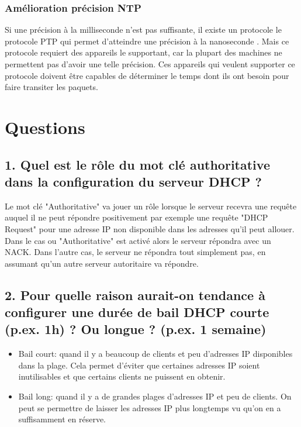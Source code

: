 \documentclass{article}
\begin{document}
\subsubsection{Amélioration précision NTP} 
Si une précision à la milliseconde n'est pas suffisante, il existe un protocole le protocole PTP qui permet d'atteindre une précision à la nanoseconde \cite{PTP}. Mais ce protocole requiert des appareils le supportant, car la plupart des machines ne permettent pas d'avoir une telle précision. Ces appareils qui veulent supporter ce protocole doivent être capables de déterminer le temps dont ils ont besoin pour faire transiter les paquets.

\clearpage

\section{Questions}

\subsection*{1. Quel est le rôle du mot clé authoritative dans la configuration du serveur DHCP ?}
Le mot clé "Authoritative" va jouer un rôle lorsque le serveur recevra une requête auquel il ne peut répondre positivement par exemple une requête "DHCP Request" pour une adresse IP non disponible dans les adresses qu'il peut allouer. Dans le cas ou "Authoritative" est activé alors le serveur répondra avec un NACK. Dans l'autre cas, le serveur ne répondra tout simplement pas, en assumant qu'un autre serveur autoritaire va répondre.\cite{authoritative}\\

\subsection*{2. Pour quelle raison aurait-on tendance à configurer une durée de bail DHCP courte (p.ex. 1h) ? Ou longue ? (p.ex. 1 semaine)}
\begin{itemize}
\item Bail court: quand il y a beaucoup de clients et peu d'adresses IP disponibles dans la plage. Cela permet d'éviter que certaines adresses IP soient inutilisables et que certains clients ne puissent en obtenir.
\item Bail long: quand il y a de grandes plages d'adresses IP et peu de clients. On peut se permettre de laisser les adresses IP plus longtemps vu qu'on en a suffisamment en réserve.
\end{itemize}
\end{document}
